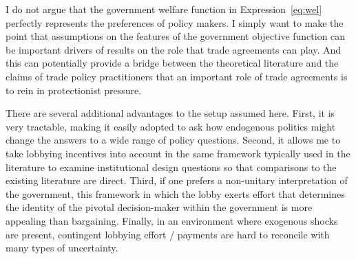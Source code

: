 \documentclass[12pt]{article}
\newcommand{\ga}{\gamma}
\begin{document}
I do not argue that the government welfare function in Expression~\ref{eq:wel} perfectly represents the preferences of policy makers. I simply want to make the point that assumptions on the features of the government objective function can be important drivers of results on the role that trade agreements can play. And this can potentially provide a bridge between the theoretical literature and the claims of trade policy practitioners that an important role of trade agreements is to rein in protectionist pressure.

There are several additional advantages to the setup assumed here. First, it is very tractable, making it easily adopted to ask how endogenous politics might change the answers to a wide range of policy questions. Second, it allows me to take lobbying incentives into account in the same framework typically used in the literature to examine institutional design questions so that comparisons to the existing literature are direct. Third, if one prefers a non-unitary interpretation of the government, this framework in which the lobby exerts effort that determines the identity of the pivotal decision-maker within the government is more appealing than bargaining. Finally, in an environment where exogenous shocks are present, contingent lobbying effort / payments are hard to reconcile with many types of uncertainty. 

\end{document}
